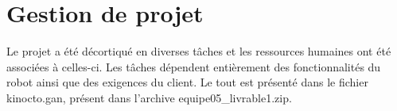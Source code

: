 


\chapter{Gestion de projet}
\label{s:projet}
Le projet a été décortiqué en diverses tâches et les ressources humaines ont été associées à celles-ci. Les tâches dépendent entièrement des fonctionnalités du robot ainsi que des exigences du client. Le tout est présenté dans le fichier kinocto.gan, présent dans l'archive equipe05\_livrable1.zip.